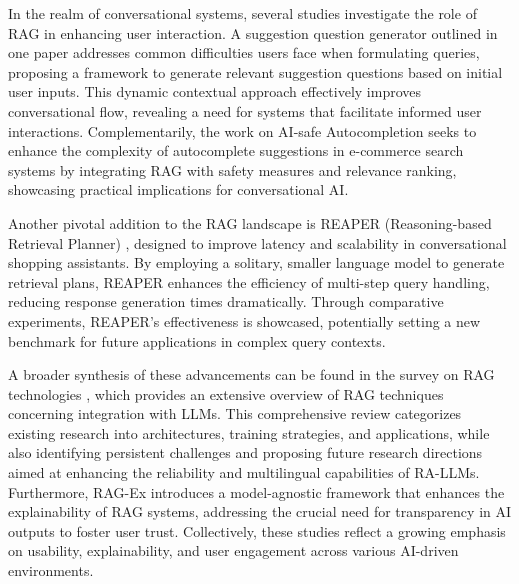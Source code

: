 In the realm of conversational systems, several studies investigate the role of RAG in enhancing user interaction. A suggestion question generator outlined in one paper \cite{10.1145/3589335.3651905} addresses common difficulties users face when formulating queries, proposing a framework to generate relevant suggestion questions based on initial user inputs. This dynamic contextual approach effectively improves conversational flow, revealing a need for systems that facilitate informed user interactions. Complementarily, the work on AI-safe Autocompletion \cite{10.1145/3627673.3679078} seeks to enhance the complexity of autocomplete suggestions in e-commerce search systems by integrating RAG with safety measures and relevance ranking, showcasing practical implications for conversational AI.

Another pivotal addition to the RAG landscape is REAPER (Reasoning-based Retrieval Planner) \cite{10.1145/3627673.3680087}, designed to improve latency and scalability in conversational shopping assistants. By employing a solitary, smaller language model to generate retrieval plans, REAPER enhances the efficiency of multi-step query handling, reducing response generation times dramatically. Through comparative experiments, REAPER's effectiveness is showcased, potentially setting a new benchmark for future applications in complex query contexts.

A broader synthesis of these advancements can be found in the survey on RAG technologies \cite{10.1145/3637528.3671470}, which provides an extensive overview of RAG techniques concerning integration with LLMs. This comprehensive review categorizes existing research into architectures, training strategies, and applications, while also identifying persistent challenges and proposing future research directions aimed at enhancing the reliability and multilingual capabilities of RA-LLMs. Furthermore, RAG-Ex \cite{10.1145/3626772.3657660} introduces a model-agnostic framework that enhances the explainability of RAG systems, addressing the crucial need for transparency in AI outputs to foster user trust. Collectively, these studies reflect a growing emphasis on usability, explainability, and user engagement across various AI-driven environments.